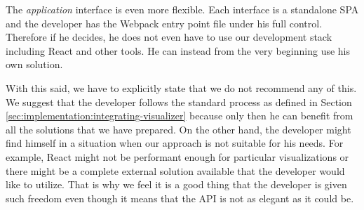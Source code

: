 The \emph{application} interface is even more flexible. Each interface is a standalone SPA and the developer has the Webpack entry point file under his full control. Therefore if he decides, he does not even have to use our development stack including React and other tools. He can instead from the very beginning use his own solution.

With this said, we have to explicitly state that we do not recommend any of this. We suggest that the developer follows the standard process as defined in Section \ref{sec:implementation:integrating-visualizer} because only then he can benefit from all the solutions that we have prepared. On the other hand, the developer might find himself in a situation when our approach is not suitable for his needs. For example, React might not be performant enough for particular visualizations or there might be a complete external solution available that the developer would like to utilize. That is why we feel it is a good thing that the developer is given such freedom even though it means that the API is not as elegant as it could be.
   